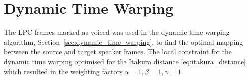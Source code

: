 
\section{Dynamic Time Warping} %
\label{imp:dynamic_time_warping}
The LPC frames marked as voiced was used in the dynamic time warping algorithm, Section~\ref{sec:dynamic_time_warping}, to find the optimal mapping between the source and target speaker frames. The local constraint for the dynamic time warping optimised for the Itakura distance \eqref{eq:itakura_distance} which resulted in the weighting factors $\alpha=1, \beta=1, \gamma=1$.



